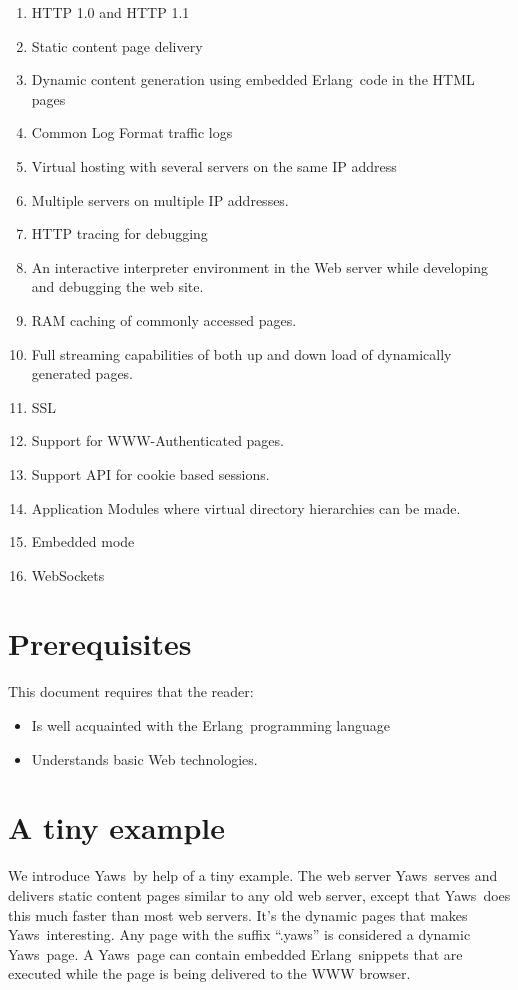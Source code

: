 \documentclass[11pt,oneside,english]{book}
\newcommand{\Erlang}            %
        {{\sc Erlang}}
\newcommand{\Yaws}            %
        {{\sc Yaws}}
\begin{document}
\begin{enumerate}
\item HTTP 1.0 and HTTP 1.1
\item Static content page delivery
\item Dynamic content generation using embedded \Erlang\  code in the
HTML pages
\item Common Log Format traffic logs
\item Virtual hosting with several servers on the same IP address
\item Multiple servers on multiple IP addresses.
\item HTTP tracing for debugging
\item An interactive interpreter environment in the Web server while
developing and debugging the web site.
\item RAM caching of commonly accessed pages.
\item Full streaming capabilities of both up and down load of dynamically
generated pages.
\item SSL
\item Support for WWW-Authenticated pages.
\item Support API for cookie based sessions.
\item Application Modules where virtual directory hierarchies can
be made.
\item Embedded mode
\item WebSockets
\end{enumerate}

\section{Prerequisites}
This document requires that the reader:
\begin{itemize}
\item Is well acquainted with the \Erlang\  programming language
\item Understands basic Web technologies.
\end{itemize}


\section{A tiny example}

We introduce \Yaws\  by help of a tiny example.
 The web server \Yaws\  serves  and delivers
static content pages similar to any old web server, except that \Yaws\  does this
much faster than most web servers. It's the dynamic pages
that makes \Yaws\  interesting. Any page with the suffix ``.yaws'' is considered
a dynamic \Yaws\  page. A \Yaws\  page can contain embedded \Erlang\  snippets that
are executed while the page is being delivered to the WWW browser.
\end{document}
